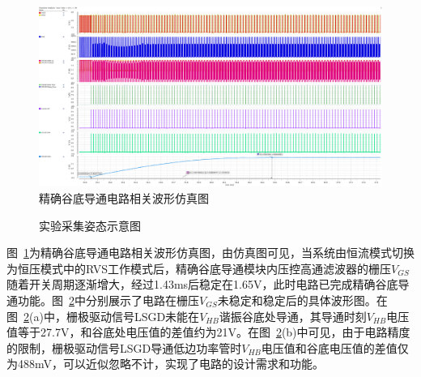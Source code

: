 \begin{figure}[htbp] 
    \centering
    \includegraphics[width=0.8\linewidth]{figures/valley_switch2.pdf}
    \caption{精确谷底导通电路相关波形仿真图}
    \label{fig:谷底导通仿真图}
\end{figure} 


\begin{figure}[htbp]
	\centering
	\caption{实验采集姿态示意图}
	\label{fig:谷底导通放大仿真图}
\end{figure}

图~\ref{fig:谷底导通仿真图}为精确谷底导通电路相关波形仿真图，由仿真图可见，当系统由恒流模式切换为恒压模式中的RVS工作模式后，精确谷底导通模块内压控高通滤波器的栅压$V_{GS}$随着开关周期逐渐增大，经过1.43ms后稳定在1.65V，此时电路已完成精确谷底导通功能。图~\ref{fig:谷底导通放大仿真图}中分别展示了电路在栅压$V_{GS}$未稳定和稳定后的具体波形图。在图~\ref{fig:谷底导通放大仿真图}(a)中，栅极驱动信号LSGD未能在$V_{HB}$谐振谷底处导通，其导通时刻$V_{HB}$电压值等于27.7V，和谷底处电压值的差值约为21V。在图~\ref{fig:谷底导通放大仿真图}(b)中可见，由于电路精度的限制，栅极驱动信号LSGD导通低边功率管时$V_{HB}$电压值和谷底电压值的差值仅为488mV，可以近似忽略不计，实现了电路的设计需求和功能。

